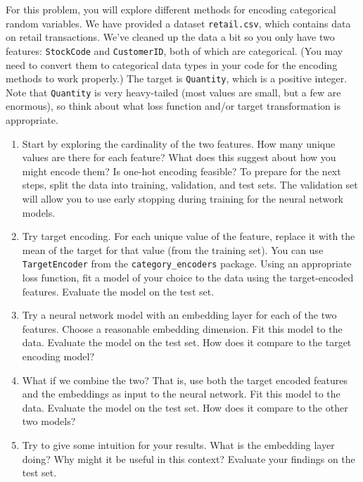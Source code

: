 \documentclass{article}
\newcounter{exercise}[section]
\newcounter{code}[section]
\begin{document}
\begin{exercise}[]
  For this problem, you will explore different methods for encoding categorical random variables. We have provided a dataset \texttt{retail.csv}, which contains data on retail transactions. We've cleaned up the data a bit so you only have two features: \texttt{StockCode} and \texttt{CustomerID}, both of which are categorical. (You may need to convert them to categorical data types in your code for the encoding methods to work properly.) The target is \texttt{Quantity}, which is a positive integer. Note that \texttt{Quantity} is very heavy-tailed (most values are small, but a few are enormous), so think about what loss function and/or target transformation is appropriate.
  \begin{enumerate}[label=(\alph*)]
    \item Start by exploring the cardinality of the two features. How many unique values are there for each feature? What does this suggest about how you might encode them? Is one-hot encoding feasible? To prepare for the next steps, split the data into training, validation, and test sets. The validation set will allow you to use early stopping during training for the neural network models.
    \item Try target encoding. For each unique value of the feature, replace it with the mean of the target for that value (from the training set). You can use \texttt{TargetEncoder} from the \texttt{category\_encoders} package. Using an appropriate loss function, fit a model of your choice to the data using the target-encoded features. Evaluate the model on the test set.
    \item Try a neural network model with an embedding layer for each of the two features. Choose a reasonable embedding dimension. Fit this model to the data. Evaluate the model on the test set. How does it compare to the target encoding model?
    \item What if we combine the two? That is, use both the target encoded features and the embeddings as input to the neural network. Fit this model to the data. Evaluate the model on the test set. How does it compare to the other two models?
    \item Try to give some intuition for your results. What is the embedding layer doing? Why might it be useful in this context? Evaluate your findings on the test set.
  \end{enumerate}
\end{exercise}
\end{document}
